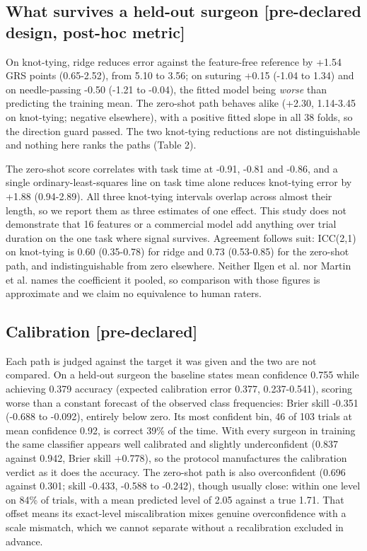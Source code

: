 \subsection{What survives a held-out surgeon [pre-declared design, post-hoc metric]}

On knot-tying, ridge reduces error against the feature-free reference by +1.54 GRS points (0.65-2.52), from 5.10 to 3.56; on suturing +0.15 (-1.04 to 1.34) and on needle-passing -0.50 (-1.21 to -0.04), the fitted model being \textit{worse} than predicting the training mean. The zero-shot path behaves alike (+2.30, 1.14-3.45 on knot-tying; negative elsewhere), with a positive fitted slope in all 38 folds, so the direction guard passed. The two knot-tying reductions are not distinguishable and nothing here ranks the paths (Table 2).

The zero-shot score correlates with task time at -0.91, -0.81 and -0.86, and a single ordinary-least-squares line on task time alone reduces knot-tying error by +1.88 (0.94-2.89). All three knot-tying intervals overlap across almost their length, so we report them as three estimates of one effect. This study does not demonstrate that 16 features or a commercial model add anything over trial duration on the one task where signal survives. Agreement follows suit: ICC(2,1) on knot-tying is 0.60 (0.35-0.78) for ridge and 0.73 (0.53-0.85) for the zero-shot path, and indistinguishable from zero elsewhere. Neither Ilgen et al. nor Martin et al. names the coefficient it pooled, so comparison with those figures is approximate and we claim no equivalence to human raters.

\subsection{Calibration [pre-declared]}

Each path is judged against the target it was given and the two are not compared. On a held-out surgeon the baseline states mean confidence 0.755 while achieving 0.379 accuracy (expected calibration error 0.377, 0.237-0.541), scoring worse than a constant forecast of the observed class frequencies: Brier skill -0.351 (-0.688 to -0.092), entirely below zero. Its most confident bin, 46 of 103 trials at mean confidence 0.92, is correct 39\% of the time. With every surgeon in training the same classifier appears well calibrated and slightly underconfident (0.837 against 0.942, Brier skill +0.778), so the protocol manufactures the calibration verdict as it does the accuracy. The zero-shot path is also overconfident (0.696 against 0.301; skill -0.433, -0.588 to -0.242), though usually close: within one level on 84\% of trials, with a mean predicted level of 2.05 against a true 1.71. That offset means its exact-level miscalibration mixes genuine overconfidence with a scale mismatch, which we cannot separate without a recalibration excluded in advance.


